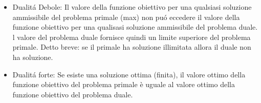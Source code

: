 \documentclass[12pt, a4paper, openany]{book}
\begin{document}
\begin{itemize}
    \item Dualitá Debole: Il valore della funzione obiettivo per una qualsiasi soluzione ammissibile del problema primale (max) non puó eccedere
    il valore della funzione obiettivo per una qualisasi soluzione ammissibile del problema duale.
    l valore del problema duale fornisce quindi un limite superiore del problema primale.
Detto breve: se il primale ha soluzione illimitata allora il duale non ha soluzione.
    \item Dualitá forte: Se esiste una soluzione ottima (finita), il valore ottimo della funzione obiettivo del problema primale è uguale al valore ottimo della funzione obiettivo del problema duale.
\end{itemize}

\end{document}
